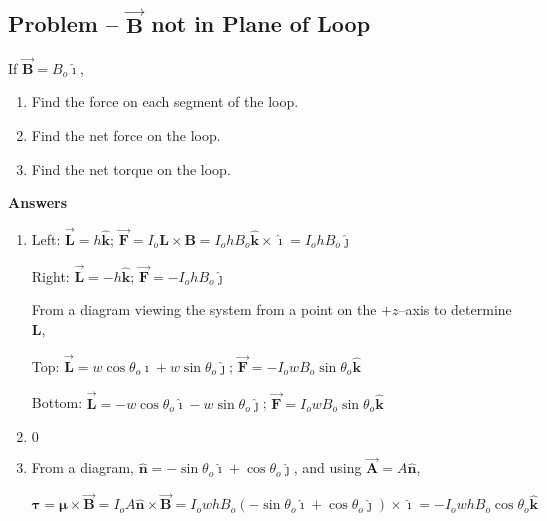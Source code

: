 \documentclass{article}
\newcommand{\ihat}[0]{\hat{\boldsymbol{\imath}}}
\newcommand{\jhat}[0]{\hat{\boldsymbol{\jmath}}}
\newcommand{\khat}[0]{\hat{\boldsymbol{k}}}
\newcommand{\bfvec}[1]{\vec{\mathbf{#1}}}
\begin{document}
\subsection{Problem -- $\bfvec{B}$ not in Plane of Loop}



If $\bfvec{B}=B_o\ihat$,

\begin{enumerate}

  \item Find the force on each segment of the loop.

  \item Find the net force on the loop.

  \item Find the net torque on the loop.

\end{enumerate}

\ifsolutions
\textbf{Answers}

    \begin{enumerate}

      \item Left: $\bfvec{L} = h\khat$; $\bfvec{F}=I_o\mathbf{L}\times\mathbf{B}=I_ohB_o\khat\times\ihat=I_ohB_o\jhat$

            Right: $\bfvec{L} = -h\khat$; $\bfvec{F}=-I_ohB_o\jhat$

            From a diagram viewing the system from a point on the $+z$--axis to determine $\mathbf{L}$,

            Top: $\bfvec{L}=w\cos\theta_o\ihat + w\sin\theta_o\jhat$; $\bfvec{F}=-I_owB_o\sin\theta_o\khat$

            Bottom: $\bfvec{L}=-w\cos\theta_o\ihat - w\sin\theta_o\jhat$; $\bfvec{F}=I_owB_o\sin\theta_o\khat$

      \item $0$

      \item From a diagram, $\hat{\mathbf{n}}=-\sin\theta_o\ihat + \cos\theta_o\jhat$, and using $\bfvec{A}=A\hat{\mathbf{n}}$,

            $\boldsymbol{\tau}=\boldsymbol{\mu}\times\bfvec{B}=I_oA\hat{\mathbf{n}}\times\bfvec{B} = I_owhB_o(-\sin\theta_o\ihat + \cos\theta_o\jhat)\times\ihat=-I_owhB_o\cos\theta_o\khat$

    \end{enumerate}
\else

\fi
\end{document}
